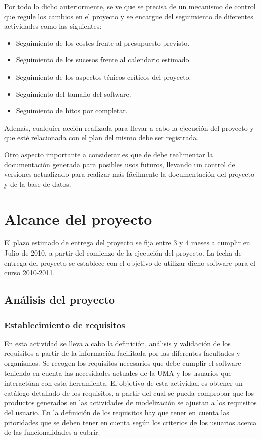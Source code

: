 \documentclass[11pt,a4paper,spanish,twoside]{report}
\begin{document}
Por todo lo dicho anteriormente, se ve que se precisa de un mecanismo de 
control que regule los cambios en el proyecto y se encargue del seguimiento de 
diferentes actividades como las siguientes:

\begin{itemize}
\item Seguimiento de los costes frente al presupuesto previsto.
\item Seguimiento de los sucesos frente al calendario estimado.
\item Seguimiento de los aspectos ténicos críticos del proyecto.
\item Seguimiento del tamaño del software.
\item Seguimiento de hitos por completar.
\end{itemize}

Además, cualquier acción realizada para llevar a cabo la ejecución del 
proyecto y que esté relacionada con el plan del mismo debe ser registrada.

Otro aspecto importante a considerar es que de debe realimentar la 
documentación generada para posibles usos futuros, llevando un control de 
versiones actualizado para realizar más fácilmente la documentación del 
proyecto y de la base de datos.

\chapter{Alcance del proyecto}
El plazo estimado de entrega del proyecto se fija entre 3 y 4 meses a cumplir
en Julio de 2010, a partir del comienzo de la ejecución del proyecto. La
fecha de entrega del proyecto se establece con el objetivo de utilizar dicho
software para el curso 2010-2011. 
\section{Análisis del proyecto}
\subsection{Establecimiento de requisitos}
En esta actividad se lleva a cabo la definición, análisis y validación de los
requisitos a partir de la información facilitada por las diferentes
facultades y organismos. Se recogen los requisitos necesarios que debe
cumplir el software teniendo en cuenta las necesidades actuales de la UMA y
los usuarios que interactúan con esta herramienta. 
El objetivo de esta actividad es obtener un catálogo detallado de los
requisitos, a partir del cual se pueda comprobar que los productos generados
en las actividades de modelización se ajustan a los requisitos del usuario.
En la definición de los requisitos hay que tener en cuenta las prioridades
que se deben tener en cuenta según los criterios de los usuarios
acerca de las funcionalidades a cubrir. 
\end{document}
